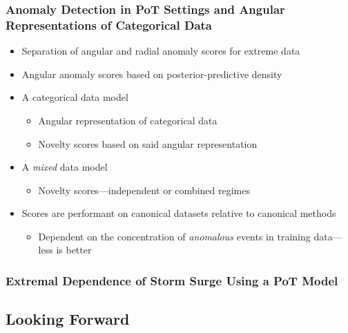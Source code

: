 \documentclass[aspectratio=169,10pt]{beamer}
\begin{document}
\begin{frame}
    \frametitle{Anomaly Detection in PoT Settings and Angular Representations of Categorical Data}
    \begin{itemize}
        \item Separation of angular and radial anomaly scores for extreme data
        \item Angular anomaly scores based on posterior-predictive density
        \item A categorical data model
        \begin{itemize}
            \item Angular representation of categorical data
            \item Novelty scores based on said angular representation
        \end{itemize}
        \item A \emph{mixed} data model
        \begin{itemize}
            \item Novelty scores---independent or combined regimes
        \end{itemize}
        \item Scores are performant on canonical datasets relative to canonical methods
        \begin{itemize}
            \item Dependent on the concentration of \emph{anomalous} events in training data---less is better
        \end{itemize}
    \end{itemize}
\end{frame}

\begin{frame}
    \frametitle{Extremal Dependence of Storm Surge Using a PoT Model}
\end{frame}

\subsection{Looking Forward}
\end{document}
